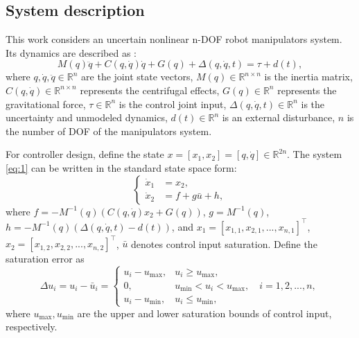 \documentclass[pdflatex,sn-mathphys-num]{sn-jnl}%
\theoremstyle{thmstyleone}%
\theoremstyle{thmstyletwo}%
\theoremstyle{thmstylethree}%
\begin{document}
\subsection{System description}
\par This work considers an uncertain nonlinear n-DOF robot manipulators system. Its dynamics are described as \cite{SciaviccoSiciliano_2012_ModellingControl,BagheriEtAl_2019_Feedbacklinearization}:
\begin{equation}
	M(q)\ddot{q} + C(q, \dot{q})\dot{q} + G(q)+ \Delta(q, \dot{q}, t)= \tau + d(t),
	\label{eq:1}
\end{equation}
where $ q, \dot{q}, \ddot{q} \in \mathbb{R}^n $ are the joint state vectors, $M(q) \in \mathbb{R}^{n\times n}$ is the inertia matrix, $C(q, \dot{q}) \in \mathbb{R}^{n\times n} $ represents the centrifugal effects, $G(q) \in \mathbb{R}^n $ represents the gravitational force, $\tau \in \mathbb{R}^n$ is the control joint input, $\Delta(q, \dot{q}, t) \in \mathbb{R}^n$ is the uncertainty and unmodeled dynamics, $d(t) \in \mathbb{R}^n$ is an external disturbance, $n$ is the number of DOF of the manipulators system.

For controller design, define the state $x = [x_1,x_2] = [q,\dot{q}] \in \mathbb{R}^{2n}$. The system \cref{eq:1} can be written in the standard state space form:
\begin{equation}
	\left\{
	\begin{aligned}
		\dot{x}_1 & = x_2,     \\
		\dot{x}_2 & =f +g \bar{u} +h,
	\end{aligned}
	\right.
	\label{eq:2}
\end{equation}
where $f=-M^{-1}(q) (C(q,\dot{q})x_2 + G(q)) $, $g=M^{-1}(q)$, $h=-M^{-1}(q)(\Delta(q,\dot{q},t) - d(t))$, and $x_1=[x_{1,1},x_{2,1},...,x_{n,1}]^{\top}$, $x_2=[x_{1,2},x_{2,2},...,x_{n,2}]^{\top}$, $\bar{u}$ denotes control input saturation. Define the saturation error as
\begin{equation}\label{eq:3}
\Delta u_{i} =  u_{i}-\bar{u}_{i}=\begin{cases} 
	u_{i}-u_{\max}, & u_i \geq u_{\max}, \\
0,       & u_{\min} < u_i < u_{\max},  \quad i=1,2,...,n,\\
u_{i}-u_{\min}, & u_i \leq u_{\min},
\end{cases}
\end{equation}
where $u_{\max},u_{\min}$ are the upper and lower saturation bounds of control input, respectively.
\end{document}
